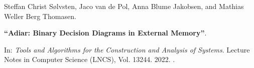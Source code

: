 Steffan Christ Sølvsten, Jaco van de Pol, Anna Blume Jakobsen, and Mathias Weller Berg Thomasen.

{\bf ``Adiar: Binary Decision Diagrams in External Memory''}.

In: \emph{Tools and Algorithms for the Construction and Analysis of Systems}.
Lecture Notes in Computer Science (LNCS), Vol. 13244. 2022.
.

\label{cite:2022.tacas}

